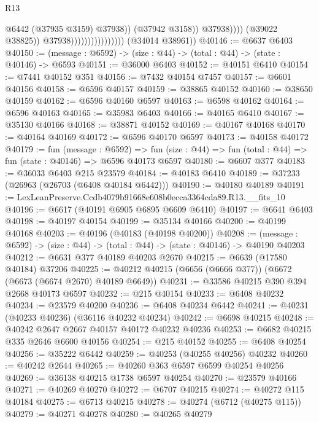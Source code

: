 \begin{lexlean}{R13}
\begin{coremodule}
                                                      @6442
                                                      (@37935 @3159)
                                                      @37938))
                                                  (@37942 @3158))
                                                @37938))))
                                        (@39022 @38825))
                                      @37938))))))))))))))))
      (@34014 @38961))
@40146 := @6637 @6403
@40150 := (message : @6592) -> (size : @44) -> (total : @44) -> (state : @40146) -> @6593
@40151 := @36000 @6403
@40152 := @40151 @6410
@40154 := @7441 @40152 @351
@40156 := @7432 @40154 @7457
@40157 := @6601 @40156
@40158 := @6596 @40157
@40159 := @38865 @40152
@40160 := @38650 @40159
@40162 := @6596 @40160 @6597
@40163 := @6598 @40162
@40164 := @6596 @40163
@40165 := @35983 @6403
@40166 := @40165 @6410
@40167 := @35130 @40166
@40168 := @38871 @40152
@40169 := @40167 @40168
@40170 := @40164 @40169
@40172 := @6596 @40170 @6597
@40173 := @40158 @40172
@40179 := fun (message : @6592) =>
  fun (size : @44) => fun (total : @44) => fun (state : @40146) => @6596 @40173 @6597
@40180 := @6607 @377
@40183 := @36033 @6403 @215 @23579
@40184 := @40183 @6410
@40189 := @37233 (@26963 (@26703 (@6408 @40184 @6442)))
@40190 := @40180 @40189
@40191 := LexLeanPreserve.Ccdb4079b91668e608b0ecca3364cda89.R13.__fits_10
@40196 := @6617 (@40191 @6905 @6895 @6609 @6410)
@40197 := @6641 @6403
@40198 := @40197 @40154
@40199 := @35134 @40166
@40200 := @40199 @40168
@40203 := @40196 (@40183 (@40198 @40200))
@40208 := (message : @6592) -> (size : @44) -> (total : @44) -> (state : @40146) -> @40190 @40203
@40212 := @6631 @377 @40189 @40203 @2670
@40215 := @6639 (@17580 @40184) @37206
@40225 := @40212 @40215 (@6656 (@6666 @377)) (@6672 (@6673 (@6674 @2670) @40189 @6649))
@40231 := @33586 @40215 @390 @394 @2668 @40173 @6597
@40232 := @215 @40154
@40233 := @6408 @40232
@40234 := @23579 @40200
@40236 := @6408 @40234 @6442
@40241 := @40231 (@40233 @40236) (@36116 @40232 @40234)
@40242 := @6698 @40215
@40248 := @40242 @2647 @2667 @40157 @40172 @40232 @40236
@40253 := @6682 @40215 @335 @2646 @6600 @40156
@40254 := @215 @40152
@40255 := @6408 @40254
@40256 := @35222 @6442
@40259 := @40253 (@40255 @40256) @40232
@40260 := @40242 @2644
@40265 := @40260 @363 @6597 @6599 @40254 @40256
@40269 := @36138 @40215 @1738 @6597 @40254
@40270 := @23579 @40166
@40271 := @40269 @40270
@40272 := @6707 @40215
@40274 := @40272 @115 @40184
@40275 := @6713 @40215
@40278 := @40274 (@6712 (@40275 @115))
@40279 := @40271 @40278
@40280 := @40265 @40279

\end{coremodule}
\end{lexlean}
